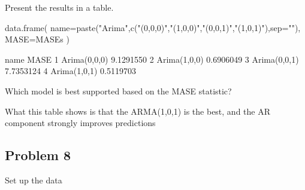 \begin{wideenumerate}
\item Present the results in a table.

\begin{Schunk}
\begin{Sinput}
 data.frame(
   name=paste("Arima",c("(0,0,0)","(1,0,0)","(0,0,1)","(1,0,1)"),sep=""), 
   MASE=MASEs
   )
\end{Sinput}
\begin{Soutput}
          name      MASE
1 Arima(0,0,0) 9.1291550
2 Arima(1,0,0) 0.6906049
3 Arima(0,0,1) 7.7353124
4 Arima(1,0,1) 0.5119703
\end{Soutput}
\end{Schunk}

\item Which model is best supported based on the MASE statistic?

What this table shows is that the ARMA(1,0,1) is the best, and the AR component strongly improves predictions

\end{wideenumerate}

\subsection*{Problem 8}
Set up the data
\begin{Schunk}
\end{Schunk}

